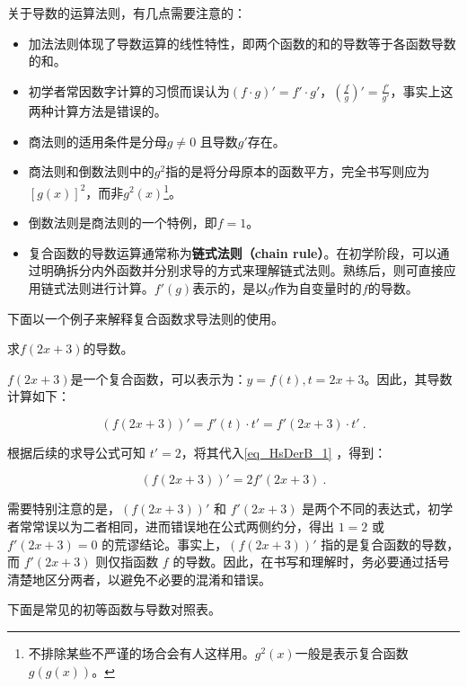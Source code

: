 关于导数的运算法则，有几点需要注意的：
\begin{itemize}
\item 加法法则体现了导数运算的线性特性，即两个函数的和的导数等于各函数导数的和。
\item 初学者常因数字计算的习惯而误认为$(f \cdot g)'= f'\cdot g'$，$\displaystyle\left(\frac{f}{g}\right)'=\frac{f'}{g'}$，事实上这两种计算方法是错误的。
\item 商法则的适用条件是分母$g\neq0$ 且导数$g'$存在。
\item 商法则和倒数法则中的$g^2$指的是将分母原本的函数平方，完全书写则应为$[g(x)]^2$，而非$g^2(x)$\footnote{不排除某些不严谨的场合会有人这样用。$g^2(x)$一般是表示复合函数$g\left(g(x)\right)$。}。
\item 倒数法则是商法则的一个特例，即$f=1$。
\item 复合函数的导数运算通常称为\textbf{链式法则（chain rule）}。在初学阶段，可以通过明确拆分内外函数并分别求导的方式来理解链式法则。熟练后，则可直接应用链式法则进行计算。$f'(g)$表示的，是以$g$作为自变量时的$f$的导数。
\end{itemize}

下面以一个例子来解释复合函数求导法则的使用。

\begin{example}{求$f(2x+3)$的导数。}

$f(2x+3)$是一个复合函数，可以表示为：$y = f(t) , t = 2x+3$。因此，其导数计算如下：

\begin{equation}\label{eq_HsDerB_1}
\left(f(2x+3)\right)' = f'(t) \cdot t' = f'(2x+3) \cdot t'~.
\end{equation}

根据后续的求导公式可知 $t' = 2$，将其代入\autoref{eq_HsDerB_1} ，得到：

\begin{equation}\label{eq_HsDerB_2}
\left(f(2x+3)\right)' = 2f'(2x+3)~.
\end{equation}

需要特别注意的是，$\left(f(2x+3)\right)'$ 和 $f'(2x+3)$ 是两个不同的表达式，初学者常常误以为二者相同，进而错误地在公式两侧约分，得出 $1 = 2$ 或 $f'(2x+3) = 0$ 的荒谬结论。事实上，$\left(f(2x+3)\right)'$ 指的是复合函数的导数，而 $f'(2x+3)$ 则仅指函数 $f$ 的导数。因此，在书写和理解时，务必要通过括号清楚地区分两者，以避免不必要的混淆和错误。
\end{example}


下面是常见的初等函数与导数对照表。

